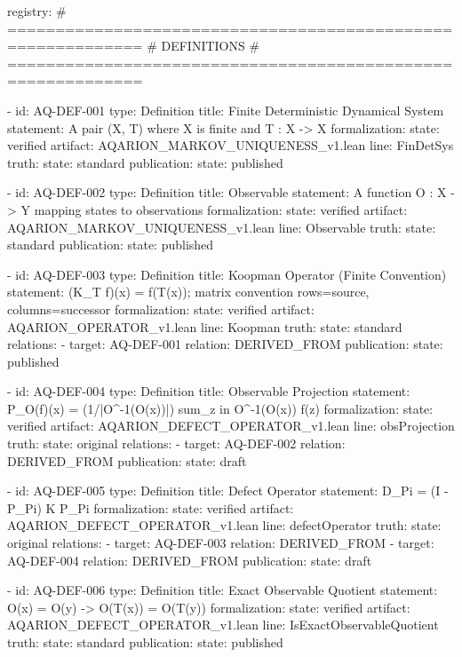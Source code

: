 {{{{{{{{{{{{{registry:
  # ============================================================
  # DEFINITIONS
  # ============================================================

  - id: AQ-DEF-001
    type: Definition
    title: Finite Deterministic Dynamical System
    statement: A pair (X, T) where X is finite and T : X -> X
    formalization:
      state: verified
      artifact: AQARION_MARKOV_UNIQUENESS_v1.lean
      line: FinDetSys
    truth:
      state: standard
    publication:
      state: published

  - id: AQ-DEF-002
    type: Definition
    title: Observable
    statement: A function O : X -> Y mapping states to observations
    formalization:
      state: verified
      artifact: AQARION_MARKOV_UNIQUENESS_v1.lean
      line: Observable
    truth:
      state: standard
    publication:
      state: published

  - id: AQ-DEF-003
    type: Definition
    title: Koopman Operator (Finite Convention)
    statement: (K_T f)(x) = f(T(x)); matrix convention rows=source, columns=successor
    formalization:
      state: verified
      artifact: AQARION_OPERATOR_v1.lean
      line: Koopman
    truth:
      state: standard
    relations:
      - target: AQ-DEF-001
        relation: DERIVED_FROM
    publication:
      state: published

  - id: AQ-DEF-004
    type: Definition
    title: Observable Projection
    statement: P_O(f)(x) = (1/|O^{-1}(O(x))|) sum_{z in O^{-1}(O(x))} f(z)
    formalization:
      state: verified
      artifact: AQARION_DEFECT_OPERATOR_v1.lean
      line: obsProjection
    truth:
      state: original
    relations:
      - target: AQ-DEF-002
        relation: DERIVED_FROM
    publication:
      state: draft

  - id: AQ-DEF-005
    type: Definition
    title: Defect Operator
    statement: D_Pi = (I - P_Pi) K P_Pi
    formalization:
      state: verified
      artifact: AQARION_DEFECT_OPERATOR_v1.lean
      line: defectOperator
    truth:
      state: original
    relations:
      - target: AQ-DEF-003
        relation: DERIVED_FROM
      - target: AQ-DEF-004
        relation: DERIVED_FROM
    publication:
      state: draft

  - id: AQ-DEF-006
    type: Definition
    title: Exact Observable Quotient
    statement: O(x) = O(y) -> O(T(x)) = O(T(y))
    formalization:
      state: verified
      artifact: AQARION_DEFECT_OPERATOR_v1.lean
      line: IsExactObservableQuotient
    truth:
      state: standard
    publication:
      state: published

}}}}}}}}}}}}}

